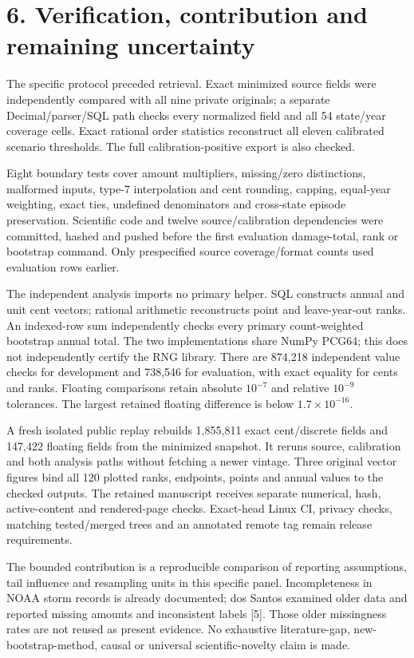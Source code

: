 \documentclass[11pt,letterpaper]{article}
\begin{document}
\newpage
\section*{6. Verification, contribution and remaining uncertainty}
The specific protocol preceded retrieval. Exact minimized source fields were independently compared with all nine private originals; a separate Decimal/parser/SQL path checks every normalized field and all 54 state/year coverage cells. Exact rational order statistics reconstruct all eleven calibrated scenario thresholds. The full calibration-positive export is also checked.

Eight boundary tests cover amount multipliers, missing/zero distinctions, malformed inputs, type-7 interpolation and cent rounding, capping, equal-year weighting, exact ties, undefined denominators and cross-state episode preservation. Scientific code and twelve source/calibration dependencies were committed, hashed and pushed before the first evaluation damage-total, rank or bootstrap command. Only prespecified source coverage/format counts used evaluation rows earlier.

The independent analysis imports no primary helper. SQL constructs annual and unit cent vectors; rational arithmetic reconstructs point and leave-year-out ranks. An indexed-row sum independently checks every primary count-weighted bootstrap annual total. The two implementations share NumPy PCG64; this does not independently certify the RNG library. There are 874,218 independent value checks for development and 738,546 for evaluation, with exact equality for cents and ranks. Floating comparisons retain absolute $10^{-7}$ and relative $10^{-9}$ tolerances. The largest retained floating difference is below $1.7\times10^{-16}$.

A fresh isolated public replay rebuilds 1,855,811 exact cent/discrete fields and 147,422 floating fields from the minimized snapshot. It reruns source, calibration and both analysis paths without fetching a newer vintage. Three original vector figures bind all 120 plotted ranks, endpoints, points and annual values to the checked outputs. The retained manuscript receives separate numerical, hash, active-content and rendered-page checks. Exact-head Linux CI, privacy checks, matching tested/merged trees and an annotated remote tag remain release requirements.

The bounded contribution is a reproducible comparison of reporting assumptions, tail influence and resampling units in this specific panel. Incompleteness in NOAA storm records is already documented; dos Santos examined older data and reported missing amounts and inconsistent labels [5]. Those older missingness rates are not reused as present evidence. No exhaustive literature-gap, new-bootstrap-method, causal or universal scientific-novelty claim is made.
\end{document}
